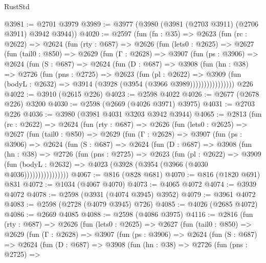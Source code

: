 \begin{lexlean}{RustStd}
\begin{coremodule}
@3981 := @2701 @3979
@3989 := @3977 (@3980 (@3981 (@2703 @3911) (@2706 @3911) @3942 @3944))
@4020 := @2597
    (fun (fn : @35) =>
    @2623
      (fun (rc : @2622) =>
      @2624
        (fun (rty : @687) =>
        @2626
          (fun (lets0 : @2625) =>
          @2627
            (fun (tail0 : @850) =>
            @2629
              (fun (Γ : @2628) =>
              @3907
                (fun (ps : @3906) =>
                @2624
                  (fun (S : @687) =>
                  @2624
                    (fun (D : @687) =>
                    @3908
                      (fun (hn : @38) =>
                      @2726
                        (fun (pns : @2725) =>
                        @2623
                          (fun (pl : @2622) =>
                          @3909
                            (fun (bodyL : @2632) => @3914 (@3928 (@3954 (@3966 @3989))))))))))))))))
    @226
@4022 := @3910 (@2615 @226)
@4023 := @2598 @4022
@4026 := @2677 (@2678 @226) @3200
@4030 := @2598 (@2669 (@4026 @3971) @3975)
@4031 := @2703 @226
@4036 := @3980 (@3981 @4031 @3203 @3942 @3944)
@4065 := @2813
    (fun (rc : @2622) =>
    @2624
      (fun (rty : @687) =>
      @2626
        (fun (lets0 : @2625) =>
        @2627
          (fun (tail0 : @850) =>
          @2629
            (fun (Γ : @2628) =>
            @3907
              (fun (ps : @3906) =>
              @2624
                (fun (S : @687) =>
                @2624
                  (fun (D : @687) =>
                  @3908
                    (fun (hn : @38) =>
                    @2726
                      (fun (pns : @2725) =>
                      @2623
                        (fun (pl : @2622) =>
                        @3909
                          (fun (bodyL : @2632) =>
                          @4023 (@3928 (@3954 (@3966 (@4030 @4036))))))))))))))))
@4067 := @816 (@828 @681)
@4070 := @816 (@1820 @691) @831
@4072 := @1034 (@4067 @4070)
@4073 := @4065 @4072
@4074 := @3939 @4072
@4078 := @2598 (@3931 (@4074 @3945) @3952)
@4079 := @3961 @4072
@4083 := @2598 (@2728 (@4079 @3945) @726)
@4085 := @4026 (@2685 @4072)
@4086 := @2669 @4085
@4088 := @2598 (@4086 @3975)
@4116 := @2816
    (fun (rty : @687) =>
    @2626
      (fun (lets0 : @2625) =>
      @2627
        (fun (tail0 : @850) =>
        @2629
          (fun (Γ : @2628) =>
          @3907
            (fun (ps : @3906) =>
            @2624
              (fun (S : @687) =>
              @2624
                (fun (D : @687) =>
                @3908
                  (fun (hn : @38) =>
                  @2726
                    (fun (pns : @2725) =>

\end{coremodule}
\end{lexlean}
